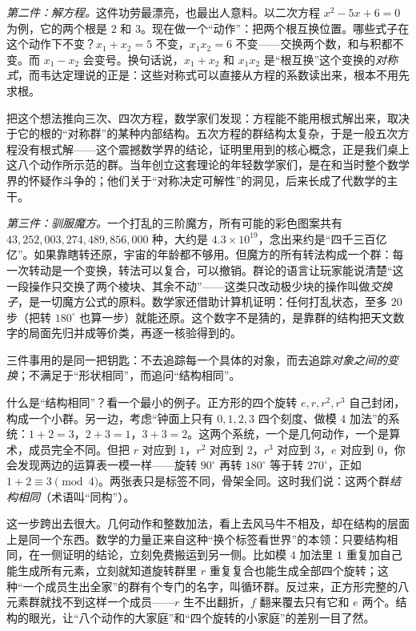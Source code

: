 \emph{第二件：解方程。}这件功劳最漂亮，也最出人意料。以二次方程 $x^2-5x+6=0$ 为例，它的两个根是 $2$ 和 $3$。现在做一个“动作”：把两个根互换位置。哪些式子在这个动作下不变？$x_1+x_2=5$ 不变，$x_1x_2=6$ 不变——交换两个数，和与积都不变。而 $x_1-x_2$ 会变号。换句话说，$x_1+x_2$ 和 $x_1x_2$ 是“根互换”这个变换的\emph{对称式}，而韦达定理说的正是：这些对称式可以直接从方程的系数读出来，根本不用先求根。

把这个想法推向三次、四次方程，数学家们发现：方程能不能用根式解出来，取决于它的根的“对称群”的某种内部结构。五次方程的群结构太复杂，于是一般五次方程没有根式解——这个震撼数学界的结论，证明里用到的核心概念，正是我们桌上这八个动作所示范的群。当年创立这套理论的年轻数学家们，是在和当时整个数学界的怀疑作斗争的；他们关于“对称决定可解性”的洞见，后来长成了代数学的主干。

\emph{第三件：驯服魔方。}一个打乱的三阶魔方，所有可能的彩色图案共有 $43{,}252{,}003{,}274{,}489{,}856{,}000$ 种，大约是 $4.3\times10^{19}$，念出来约是“四千三百亿亿”。如果靠瞎转还原，宇宙的年龄都不够用。但魔方的所有转法构成一个群：每一次转动是一个变换，转法可以复合，可以撤销。群论的语言让玩家能说清楚“这一段操作只交换了两个棱块、其余不动”——这类只改动极少块的操作叫做\emph{交换子}，是一切魔方公式的原料。数学家还借助计算机证明：任何打乱状态，至多 $20$ 步（把转 $180^\circ$ 也算一步）就能还原。这个数字不是猜的，是靠群的结构把天文数字的局面先归并成等价类，再逐一核验得到的。

三件事用的是同一把钥匙：不去追踪每一个具体的对象，而去追踪\emph{对象之间的变换}；不满足于“形状相同”，而追问“结构相同”。

什么是“结构相同”？看一个最小的例子。正方形的四个旋转 $e,r,r^2,r^3$ 自己封闭，构成一个小群。另一边，考虑“钟面上只有 $0,1,2,3$ 四个刻度、做模 $4$ 加法”的系统：$1+2=3$，$2+3=1$，$3+3=2$。这两个系统，一个是几何动作，一个是算术，成员完全不同。但把 $r$ 对应到 $1$，$r^2$ 对应到 $2$，$r^3$ 对应到 $3$，$e$ 对应到 $0$，你会发现两边的运算表一模一样——旋转 $90^\circ$ 再转 $180^\circ$ 等于转 $270^\circ$，正如 $1+2\equiv3\pmod 4$。两张表只是标签不同，骨架全同。这时我们说：这两个群\emph{结构相同}（术语叫“同构”）。

这一步跨出去很大。几何动作和整数加法，看上去风马牛不相及，却在结构的层面上是同一个东西。数学的力量正来自这种“换个标签看世界”的本领：只要结构相同，在一侧证明的结论，立刻免费搬运到另一侧。比如模 $4$ 加法里 $1$ 重复加自己能生成所有元素，立刻就知道旋转群里 $r$ 重复复合也能生成全部四个旋转；这种“一个成员生出全家”的群有个专门的名字，叫循环群。反过来，正方形完整的八元素群就找不到这样一个成员——$r$ 生不出翻折，$f$ 翻来覆去只有它和 $e$ 两个。结构的眼光，让“八个动作的大家庭”和“四个旋转的小家庭”的差别一目了然。

